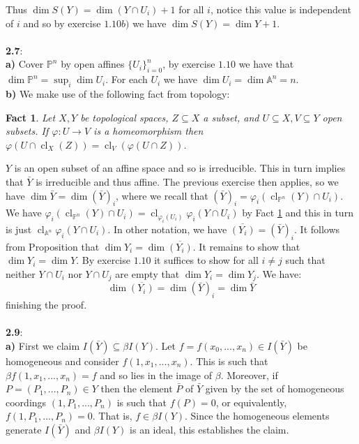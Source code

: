 \documentclass[12pt]{article}
\numberwithin{thm}{subsection}
\numberwithin{defn}{subsection}
\numberwithin{lemma}{subsection}
\numberwithin{example}{subsection}
\numberwithin{notation}{subsection}
\numberwithin{cor}{subsection}
\numberwithin{remark}{subsection}
\numberwithin{condition}{subsection}
\numberwithin{question}{subsection}
\numberwithin{construction}{subsection}
\numberwithin{construction}{subsection}
\numberwithin{construction}{subsection}
\newtheorem{fact}{Fact}
\newcommand{\bb}[1]{\mathbb{#1}}
\begin{document}
Thus $\operatorname{dim}S(Y) = \operatorname{dim}(Y\cap U_i) + 1$ for all $i$, notice this value is independent of $i$ and so by exercise $1.10b)$ we have $\operatorname{dim}S(Y) = \operatorname{dim}Y + 1$.\\\\
%
\textbf{2.7}:\\
\textbf{a)} Cover $\bb{P}^n$ by open affines $\lbrace U_i\rbrace_{i = 0}^n$, by exercise $1.10$ we have that $\operatorname{dim}\bb{P}^n = \sup_i\operatorname{dim}U_i$. For each $U_i$ we have $\operatorname{dim}U_i = \operatorname{dim}\bb{A}^n = n$.\\
\textbf{b)} 
We make use of the following fact from topology:
\begin{fact}
\label{fact:homeo_closure} Let $X, Y$ be topological spaces, $Z \subseteq X$ a subset, and $U \subseteq X, V \subseteq Y$ open subsets. If $\varphi: U \to V$ is a homeomorphism then $\varphi(U \cap \operatorname{cl}_X(Z)) = \operatorname{cl}_V(\varphi(U \cap Z))$.
\end{fact}
%
$Y$ is an open subset of an affine space and so is irreducible. This in turn implies that $\bar{Y}$ is irreducible and thus affine. The previous exercise then applies, so we have $\operatorname{dim}\bar{Y} = \operatorname{dim}(\bar{Y})_i$, where we recall that $(\bar{Y})_i = \varphi_i(\operatorname{cl}_{\bb{P}^n}(Y) \cap U_i)$. We have $\varphi_i(\operatorname{cl}_{\bb{P}^n}(Y) \cap U_i) = \operatorname{cl}_{\varphi_i(U_i)}\varphi_i(Y \cap U_i)$ by Fact \ref{fact:homeo_closure} and this in turn is just $\operatorname{cl}_{\bb{A}^n}\varphi_i(Y \cap U_i)$. In other notation, we have $\overline{(Y_i)} = (\bar{Y})_i$. It follows from Proposition \cite[\S 1 1.10]{hartshorne} that $\operatorname{dim}Y_i = \operatorname{dim}\overline{(Y_i)}$. It remains to show that $\operatorname{dim}Y_i = \operatorname{dim}Y$. By exercise $1.10$ it suffices to show for all $i \neq j$ such that neither $Y \cap U_i$ nor $Y \cap U_j$ are empty that $\operatorname{dim}Y_i = \operatorname{dim}Y_j$. We have:
\[\operatorname{dim}\overline{(Y_i)} = \operatorname{dim}(\bar{Y})_i = \operatorname{dim}\bar{Y}\]
finishing the proof.\\\\
%
\textbf{2.9}:\\
\textbf{a)} First we claim $I(\bar{Y}) \subseteq \beta I(Y)$. Let $f = f(x_0,...,x_n)\in I(\bar{Y})$ be homogeneous and consider $f(1,x_1,...,x_n)$. This is such that $\beta f(1,x_1,...,x_n) = f$ and so lies in the image of $\beta$. Moreover, if $P = (P_1,...,P_n) \in Y$ then the element $\bar{P}$ of $\bar{Y}$ given by the set of homogeneous coordings $(1,P_1,...,P_n)$ is such that $f(P) = 0$, or equivalently, $f(1,P_1,...,P_n) = 0$. That is, $f \in \beta I(Y)$. Since the homogeneous elements generate $I(\bar{Y})$ and $\beta I(Y)$ is an ideal, this establishes the claim.\\
\end{document}
